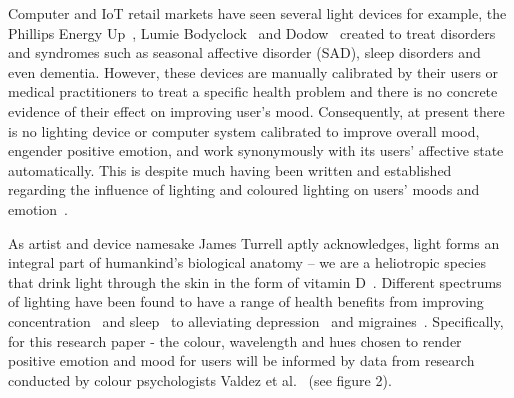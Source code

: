\documentclass{sigchi}
\begin{document}
Computer and IoT retail markets have seen several light devices for example, the Phillips Energy Up~\cite{Phillips01}, Lumie Bodyclock~\cite{Lumie01} and Dodow~\cite{Dodow01} created to treat disorders and syndromes such as seasonal affective disorder (SAD), sleep disorders and even dementia. However, these devices are manually calibrated by their users or medical practitioners to treat a specific health problem and there is no concrete evidence of their effect on improving user’s mood. Consequently, at present there is no lighting device or computer system calibrated to improve overall mood, engender positive emotion, and work synonymously with its users’ affective state automatically. This is despite much having been written and established regarding the influence of lighting and coloured lighting on users’ moods and emotion~\cite{baron1992effects, han2017effects, jo2014smart, kim2014study, lee2019effects, wardono2012effects, yang2015lighting}. 

As artist and device namesake James Turrell aptly acknowledges, light forms an integral part of humankind’s biological anatomy – we are a heliotropic species that drink light through the skin in the form of vitamin D~\cite{adcock1990james, basse2016light}. Different spectrums of lighting have been found to have a range of health benefits from improving concentration~\cite{kuller2006impact} and sleep~\cite{} to alleviating depression~\cite{kripke1998light} and migraines~\cite{Green01}. Specifically, for this research paper - the colour, wavelength and hues chosen to render positive emotion and mood for users will be informed by data from research conducted by colour psychologists Valdez et al.~\cite{valdez1994effects} (see figure 2). 
\end{document}
